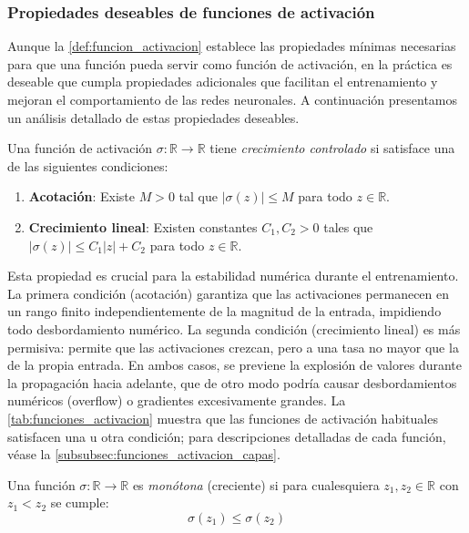 \subsubsection{Propiedades deseables de funciones de activación}

Aunque la \autoref{def:funcion_activacion} establece las propiedades mínimas necesarias para que una función pueda servir como función de activación, en la práctica es deseable que cumpla propiedades adicionales que facilitan el entrenamiento y mejoran el comportamiento de las redes neuronales. A continuación presentamos un análisis detallado de estas propiedades deseables.

\begin{definition}\label{prop:acotacion_activacion}
	Una función de activación $\sigma: \mathbb{R} \to \mathbb{R}$ tiene \textit{crecimiento controlado} si satisface una de las siguientes condiciones:
	\begin{enumerate}
		\item \textbf{Acotación}: Existe $M > 0$ tal que $|\sigma(z)| \leq M$ para todo $z \in \mathbb{R}$.
		\item \textbf{Crecimiento lineal}: Existen constantes $C_1, C_2 > 0$ tales que $|\sigma(z)| \leq C_1|z| + C_2$ para todo $z \in \mathbb{R}$.
	\end{enumerate}
\end{definition}

Esta propiedad es crucial para la estabilidad numérica durante el entrenamiento. La primera condición (acotación) garantiza que las activaciones permanecen en un rango finito independientemente de la magnitud de la entrada, impidiendo todo desbordamiento numérico. La segunda condición (crecimiento lineal) es más permisiva: permite que las activaciones crezcan, pero a una tasa no mayor que la de la propia entrada. En ambos casos, se previene la explosión de valores durante la propagación hacia adelante, que de otro modo podría causar desbordamientos numéricos (overflow) o gradientes excesivamente grandes. La \autoref{tab:funciones_activacion} muestra que las funciones de activación habituales satisfacen una u otra condición; para descripciones detalladas de cada función, véase la \autoref{subsubsec:funciones_activacion_capas}.

\begin{definition}[Monotonía]\label{prop:monotonia_activacion}
	Una función $\sigma: \mathbb{R} \to \mathbb{R}$ es \textit{monótona} (creciente) si para cualesquiera $z_1, z_2 \in \mathbb{R}$ con $z_1 < z_2$ se cumple:
	\[
	\sigma(z_1) \leq \sigma(z_2)
	\]
\end{definition}

